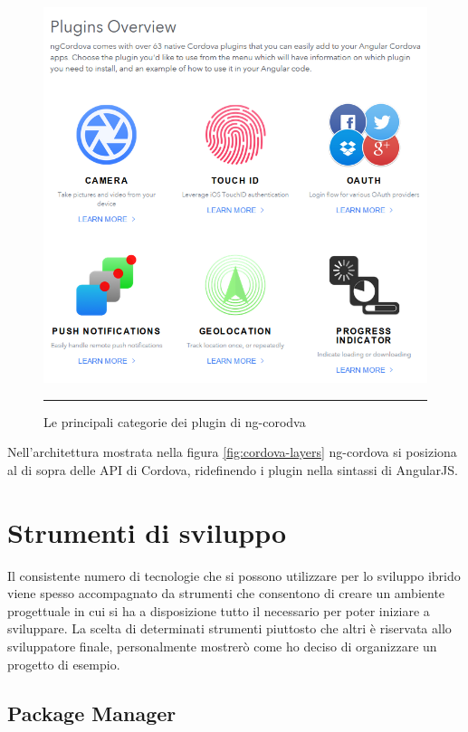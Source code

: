 \begin{figure}[ht]
  \centering
    \includegraphics[scale=0.66]{Figures/ngcordova-plugins.png} 
    \rule{35em}{0.5pt}
  \caption[ngCordova Plugin]{Le principali categorie dei plugin di ng-corodva}
  \label{fig:ngcordova-plugins}
\end{figure}

Nell'architettura mostrata nella figura \ref{fig:cordova-layers} ng-cordova si posiziona al di sopra delle API di Cordova, ridefinendo i plugin nella sintassi di AngularJS. 

\section{Strumenti di sviluppo}

Il consistente numero di tecnologie che si possono utilizzare per lo sviluppo ibrido viene spesso accompagnato da strumenti che consentono di creare un ambiente progettuale in cui si ha a disposizione tutto il necessario per poter iniziare a sviluppare. La scelta di determinati strumenti piuttosto che altri è riservata allo sviluppatore finale, personalmente mostrerò come ho deciso di organizzare un progetto di esempio.

\subsection{Package Manager}

